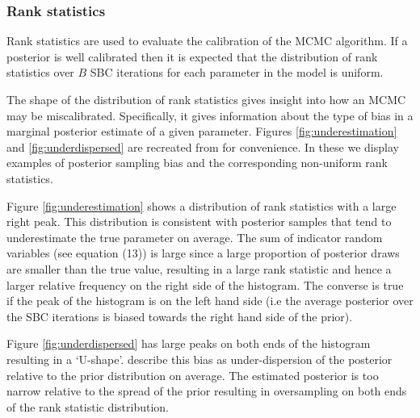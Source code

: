 \documentclass[12pt, a4paper]{article}
\begin{document}
        \subsubsection{Rank statistics}
            Rank statistics are used to evaluate the calibration of the MCMC algorithm. If a posterior is well calibrated then it is expected that the distribution of rank statistics over $B$ SBC iterations for each parameter in the model is uniform.

            The shape of the distribution of rank statistics gives insight into how an MCMC may be miscalibrated. Specifically, it gives information about the type of bias in a marginal posterior estimate of a given parameter. Figures \ref{fig:underestimation} and \ref{fig:underdispersed} are recreated from \citet{talts2018validating} for convenience. In these we display examples of posterior sampling bias and the corresponding non-uniform rank statistics.

            Figure \ref{fig:underestimation} shows a distribution of rank statistics with a large right peak. This distribution is consistent with posterior samples that tend to underestimate the true parameter on average. The sum of indicator random variables (see equation (13)) is large since a large proportion of posterior draws are smaller than the true value, resulting in a large rank statistic and hence a larger relative frequency on the right side of the histogram. The converse is true if the peak of the histogram is on the left hand side (i.e the average posterior over the SBC iterations is biased towards the right hand side of the prior). 

            Figure \ref{fig:underdispersed} has large peaks on both ends of the histogram resulting in a `U-shape'. \citet{talts2018validating} describe this bias as under-dispersion of the posterior relative to the prior distribution on average. The estimated posterior is too narrow relative to the spread of the prior resulting in oversampling on both ends of the rank statistic distribution. 

        
\end{document}
